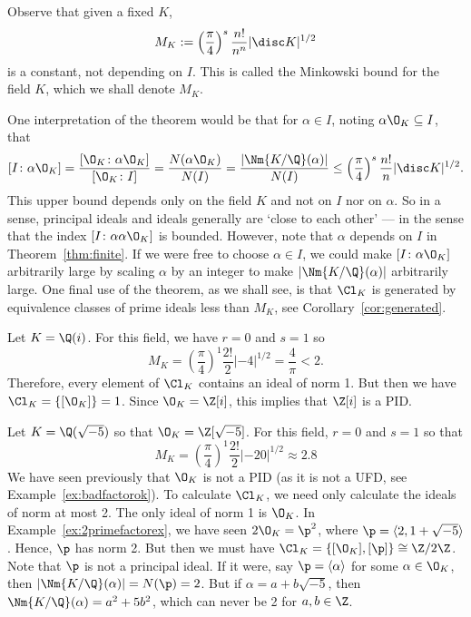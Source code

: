 \begin{rem}
Observe that given a fixed $K$,
	\[
	M_K:= \left(\dfrac{\pi}{4}\right)^s \dfrac{n!}{n^n} |\disc K|^{1/2}
	\]
is a constant, not depending on $I$. This is called the Minkowski bound for the field $K$, which we shall denote $M_K$. 
\end{rem}

One interpretation of the theorem would be that for $\alpha \in I$, noting $\alpha \O_K \subseteq I$, that
	\[
	[I \colon \alpha \O_K]= \dfrac{[\O_K \colon \alpha \O_K]}{[\O_K \colon I]} = \dfrac{N(\alpha \O_K)}{N(I)} = \dfrac{|\Nm{K/\Q}(\alpha)|}{N(I)} \leq \left(\dfrac{\pi}{4}\right)^s \dfrac{n!}{n} |\disc K|^{1/2}.
	\]
This upper bound depends only on the field $K$ and not on $I$ nor on $\alpha$. So in a sense, principal ideals and ideals generally are `close to each other' --- in the sense that the index $[I \colon \alpha \alpha\O_K]$ is bounded. However, note that $\alpha$ depends on $I$ in Theorem~\ref{thm:finite}. If we were free to choose $\alpha \in I$, we could make $[I \colon \alpha \O_K]$ arbitrarily large by scaling $\alpha$ by an integer to make $|\Nm{K/\Q}(\alpha)|$ arbitrarily large. One final use of the theorem, as we shall see, is that $\Cl_K$ is generated by equivalence classes of prime ideals less than $M_K$, see Corollary~\ref{cor:generated}. 


\begin{ex}
Let $K=\Q(i)$. For this field, we have $r=0$ and $s=1$ so
	\[
	M_K= \left(\dfrac{\pi}{4}\right)^1 \dfrac{2!}{2} | -4|^{1/2}= \dfrac{4}{\pi}<2. 
	\]
Therefore, every element of $\Cl_K$ contains an ideal of norm 1. But then we have $\Cl_K=\{[\O_K]\}=1$. Since $\O_K=\Z[i]$, this implies that $\Z[i]$ is a PID. \xqed
\end{ex}

\begin{ex}
Let $K=\Q(\sqrt{-5})$ so that $\O_K=\Z[\sqrt{-5}]$. For this field, $r=0$ and $s=1$ so that
	\[
	M_K=  \left(\dfrac{\pi}{4}\right)^1 \dfrac{2!}{2} |-20|^{1/2} \approx 2.8
	\]
We have seen previously that $\O_K$ is not a PID (as it is not a UFD, see Example~\ref{ex:badfactorok}). To calculate $\Cl_K$, we need only calculate the ideals of norm at most 2. The only ideal of norm 1 is $\O_K$. In Example~\ref{ex:2primefactorex}, we have seen $2\O_K=\p^2$, where $\p=\langle 2,1+\sqrt{-5}\rangle$. Hence, $\p$ has norm 2. But then we must have $\Cl_K=\{[\O_K], [\p]\} \cong \Z/2\Z$. Note that $\p$ is not a principal ideal. If it were, say $\p=\langle \alpha \rangle$ for some $\alpha \in \O_K$, then $|\Nm{K/\Q}(\alpha)|=N(\p)=2$. But if $\alpha=a+b\sqrt{-5}$, then $\Nm{K/\Q}(\alpha)=a^2+5b^2$, which can never be 2 for $a,b \in \Z$. \xqed
\end{ex}


